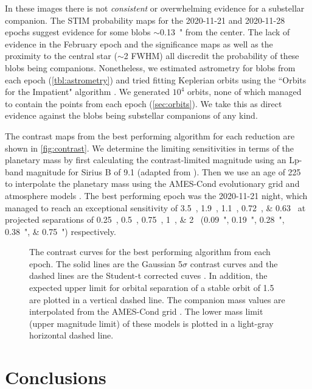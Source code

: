 \documentclass[twocolumn]{aastex631}
\begin{document}
In these images there is not \textit{consistent} or overwhelming evidence for a substellar companion. The STIM probability maps for the 2020-11-21 and 2020-11-28 epochs suggest evidence for some blobs $\sim$\qty{0.13}{"} from the center. The lack of evidence in the February epoch and the significance maps as well as the proximity to the central star ($\sim$2 FWHM) all discredit the probability of these blobs being companions. Nonetheless, we estimated astrometry for blobs from each epoch (\autoref{tbl:astrometry}) and tried fitting Keplerian orbits using the ``Orbits for the Impatient" algorithm \citep[OFTI;][]{blunt_orbits_2017}. We generated $10^4$ orbits, none of which managed to contain the points from each epoch (\autoref{sec:orbits}). We take this as direct evidence against the blobs being substellar companions of any kind.

The contrast maps from the best performing algorithm for each reduction are shown in \autoref{fig:contrast}. We determine the limiting sensitivities in terms of the planetary mass by first calculating the contrast-limited magnitude using an Lp-band magnitude for Sirius B of 9.1 (adapted from \citealp{bonnet-bidaud_adonis_2008}). Then we use an age of \qty{225}{\mega\year} to interpolate the planetary mass using the AMES-Cond evolutionary grid and atmosphere models \citep{allard_models_2012}. The best performing epoch was the 2020-11-21 night, which managed to reach an exceptional sensitivity of \qtylist[list-units=single]{3.5;1.9;1.1;0.72;0.63}{\mj} at projected separations of \qtylist[list-units=single]{0.25;0.5;0.75;1;2}{\au} (\qtylist[list-units=single]{0.09;0.19;0.28;0.38;0.75}{"}) respectively.

\begin{figure*}[t]
    \centering
    \caption{The contrast curves for the best performing algorithm from each epoch. The solid lines are the Gaussian 5$\sigma$ contrast curves and the dashed lines are the Student-t corrected cuves \citep{mawet_fundamental_2014}. In addition, the expected upper limit for orbital separation of a stable orbit \citep{bond_sirius_2017} of \qty{1.5}{\au} are plotted in a vertical dashed line. The companion mass values are interpolated from the AMES-Cond grid \citep{allard_models_2012}. The lower mass limit (upper magnitude limit) of these models is plotted in a light-gray horizontal dashed line.}
    \label{fig:contrast}
\end{figure*}


\section{Conclusions} \label{sec:conclusion}
\end{document}
